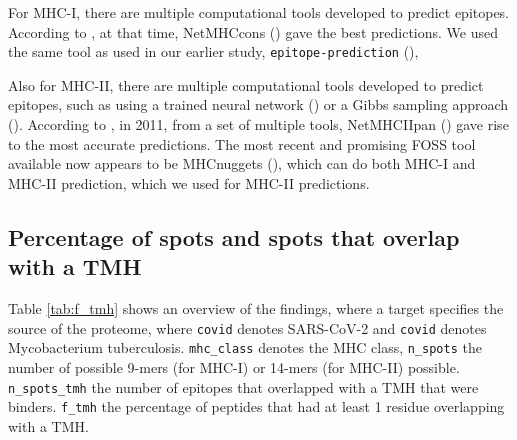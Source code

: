 
For MHC-I, there are multiple computational tools developed 
to predict epitopes. 
According to \cite{lundegaard2011prediction}, at that time,
NetMHCcons (\cite{karosiene2012netmhccons}) gave the best predictions.
We used the same tool as used in our earlier study, \verb;epitope-prediction; (\cite{bianchi2017}),


Also for MHC-II, there are multiple computational tools developed 
to predict epitopes,
such as using a trained neural network (\cite{nielsen2003reliable})
or a Gibbs sampling approach (\cite{nielsen2004improved}).
According to \cite{lundegaard2011prediction}, in 2011,
from a set of multiple tools, 
NetMHCIIpan (\cite{nielsen2008quantitative,karosiene2013netmhciipan})
gave rise to the most accurate predictions.
The most recent and promising FOSS tool available now appears
to be MHCnuggets (\cite{shao2020high}), which can do both MHC-I 
and MHC-II prediction, which we used for MHC-II predictions.

\subsection{Percentage of spots and spots that overlap with a TMH}

Table \ref{tab:f_tmh} shows an overview of the findings,
where a target specifies the source of the proteome,
where \verb;covid; denotes SARS-CoV-2 and \verb;covid; denotes
Mycobacterium tuberculosis. \verb;mhc_class; denotes the MHC
class, \verb;n_spots; the number of possible 9-mers (for MHC-I) 
or 14-mers (for MHC-II) possible. \verb;n_spots_tmh; the
number of epitopes that overlapped with a TMH that were binders. 
\verb;f_tmh; the percentage of peptides that had at least 1 residue
overlapping with a TMH.



